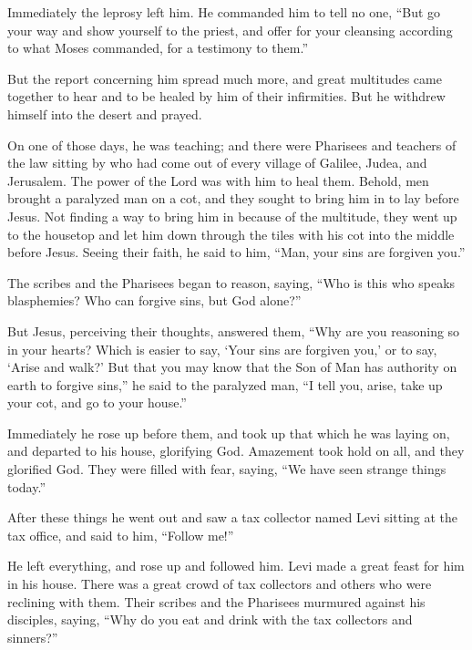 Immediately the leprosy left him.  He commanded him to tell
no one, ``But go your way and show yourself to the priest, and offer for
your cleansing according to what Moses commanded, for a testimony to
them.''

 But the report concerning him spread much more, and great
multitudes came together to hear and to be healed by him of their
infirmities.  But he withdrew himself into the desert and
prayed.

 On one of those days, he was teaching; and there were
Pharisees and teachers of the law sitting by who had come out of every
village of Galilee, Judea, and Jerusalem. The power of the Lord was with
him to heal them.  Behold, men brought a paralyzed man on a
cot, and they sought to bring him in to lay before Jesus. 
Not finding a way to bring him in because of the multitude, they went up
to the housetop and let him down through the tiles with his cot into the
middle before Jesus.  Seeing their faith, he said to him,
``Man, your sins are forgiven you.''

 The scribes and the Pharisees began to reason, saying,
``Who is this who speaks blasphemies? Who can forgive sins, but God
alone?''

 But Jesus, perceiving their thoughts, answered them, ``Why
are you reasoning so in your hearts?  Which is easier to
say, `Your sins are forgiven you,' or to say, `Arise and walk?'
 But that you may know that the Son of Man has authority on
earth to forgive sins,'' he said to the paralyzed man, ``I tell you,
arise, take up your cot, and go to your house.''

 Immediately he rose up before them, and took up that which
he was laying on, and departed to his house, glorifying God.
 Amazement took hold on all, and they glorified God. They
were filled with fear, saying, ``We have seen strange things today.''

 After these things he went out and saw a tax collector
named Levi sitting at the tax office, and said to him, ``Follow me!''

 He left everything, and rose up and followed him.
 Levi made a great feast for him in his house. There was a
great crowd of tax collectors and others who were reclining with them.
 Their scribes and the Pharisees murmured against his
disciples, saying, ``Why do you eat and drink with the tax collectors
and sinners?''

